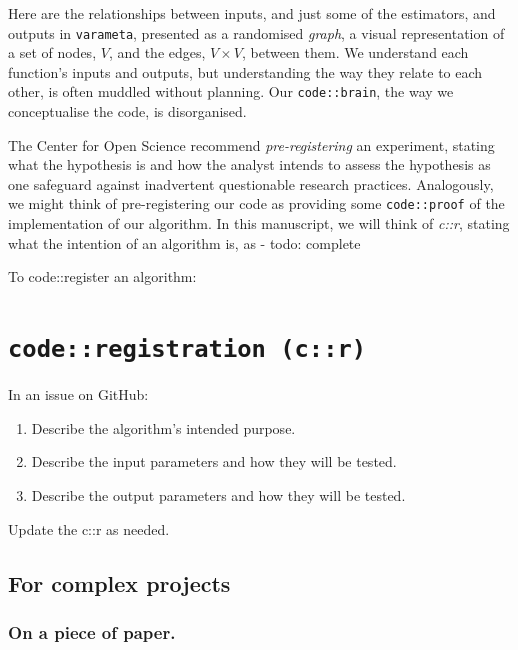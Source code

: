 \documentclass[
]{article}
\providecommand{\tightlist}{%
  \setlength{\itemsep}{0pt}\setlength{\parskip}{0pt}}
\begin{document}
Here are the relationships between inputs, and just some of the estimators, and outputs in \texttt{varameta}, presented as a randomised \emph{graph}, a visual representation of a set of nodes, \(V\), and the edges, \(V \times V\), between them. We understand each function's inputs and outputs, but understanding the way they relate to each other, is often muddled without planning. Our \texttt{code::brain}, the way we conceptualise the code, is disorganised.

The Center for Open Science recommend \emph{pre-registering} an experiment, stating what the hypothesis is and how the analyst intends to assess the hypothesis as one safeguard against inadvertent questionable research practices. Analogously, we might think of pre-registering our code as providing some \texttt{code::proof} of the implementation of our algorithm. In this manuscript, we will think of \emph{c::r}, stating what the intention of an algorithm is, as - todo: complete

To code::register an algorithm:

\hypertarget{coderegistration-cr-1}{%
\section{\texorpdfstring{\texttt{code::registration\ (c::r)}}{code::registration (c::r)}}\label{coderegistration-cr-1}}

In an issue on GitHub:

\begin{enumerate}
\def\labelenumi{\arabic{enumi}.}
\tightlist
\item
  Describe the algorithm's intended purpose.
\item
  Describe the input parameters and how they will be tested.
\item
  Describe the output parameters and how they will be tested.
\end{enumerate}

Update the c::r as needed.

\hypertarget{for-complex-projects}{%
\subsection{For complex projects}\label{for-complex-projects}}

\hypertarget{on-a-piece-of-paper.}{%
\subsubsection{On a piece of paper.}\label{on-a-piece-of-paper.}}
\end{document}
